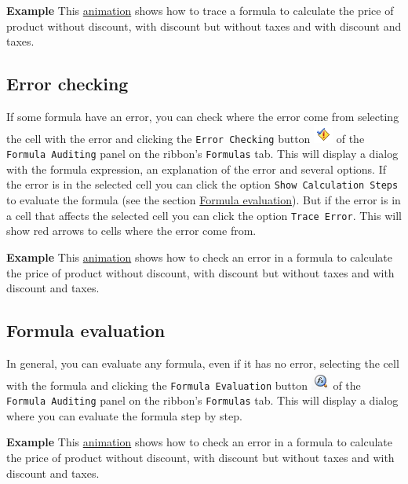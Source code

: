 \textbf{Example} This \href{http://aprendeconalf.es/office/excel/manual/img/example_formula_trace.gif}{animation} shows how to trace a formula to calculate the price of product without discount, with discount but without taxes and with discount and taxes.

\subsection{Error checking}\hypertarget{error-checking}{}\label{error-checking}

If some formula have an error, you can check where the error come from selecting the cell with the error and clicking
the \texttt{Error Checking} button \includegraphics[scale=0.7]{../img/button_error_checking.png} of the \texttt{Formula
Auditing} panel on the ribbon's \texttt{Formulas} tab. This will display a dialog with the formula expression, an explanation of the error and several options. If the error is in the selected cell you can click the option \texttt{Show Calculation Steps} to evaluate the formula (see the section \hyperlink{formula\_evaluation}{Formula evaluation}). But if the error is in a cell that affects the selected cell you can click the option \texttt{Trace Error}. This will show red arrows to cells where the error come from.

\textbf{Example} This \href{http://aprendeconalf.es/office/excel/manual/img/example_error_checking.gif}{animation} shows how to check an error in a formula to calculate the price of product without discount, with discount but without taxes and with discount and taxes.

\subsection{Formula evaluation}\hypertarget{a-nameformulaevaluationaformula-evaluation}{}\label{a-nameformulaevaluationaformula-evaluation}

In general, you can evaluate any formula, even if it has no error, selecting the cell with the formula and clicking the
\texttt{Formula Evaluation} button \includegraphics[scale=0.7]{../img/button_evaluate_formula.png} of the
\texttt{Formula Auditing} panel on the ribbon's \texttt{Formulas} tab. This will display a dialog where you can evaluate the formula step by step.

\textbf{Example} This \href{http://aprendeconalf.es/office/excel/manual/img/example_formula_evaluation.gif}{animation} shows how to check an error in a formula to calculate the price of product without discount, with discount but without taxes and with discount and taxes.

